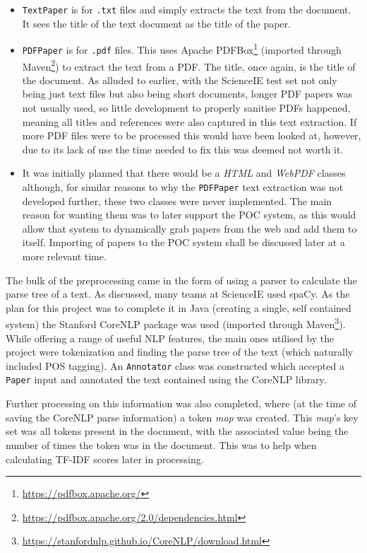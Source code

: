 \begin{itemize}
	\item \texttt{TextPaper} is for \texttt{.txt} files and simply extracts the text from the document. It sees the title of the text document as the title of the paper.
	\item \texttt{PDFPaper} is for \texttt{.pdf} files. This uses Apache PDFBox\footnote{\href{https://pdfbox.apache.org/}{https://pdfbox.apache.org/}} (imported through Maven\footnote{\href{https://pdfbox.apache.org/2.0/dependencies.html}{https://pdfbox.apache.org/2.0/dependencies.html}}) to extract the text from a PDF. The title, once again, is the title of the document. As alluded to earlier, with the ScienceIE test set not only being just text files but also being short documents, longer PDF papers was not usually used, so little development to properly sanitise PDFs happened, meaning all titles and references were also captured in this text extraction. If more PDF files were to be processed this would have been looked at, however, due to its lack of use the time needed to fix this was deemed not worth it.
	\item It was initially planned that there would be a \textit{HTML} and \textit{WebPDF} classes although, for similar reasons to why the \texttt{PDFPaper} text extraction was not developed further, these two classes were never implemented. The main reason for wanting them was to later support the POC system, as this would allow that system to dynamically grab papers from the web and add them to itself. Importing of papers to the POC system shall be discussed later at a more relevant time.
\end{itemize}

The bulk of the preprocessing came in the form of using a parser to calculate the parse tree of a text. As discussed, many teams at ScienceIE used spaCy. As the plan for this project was to complete it in Java (creating a single, self contained system) the Stanford CoreNLP package was used \cite{Manning2014} (imported through Maven\footnote{\href{https://stanfordnlp.github.io/CoreNLP/download.html}{https://stanfordnlp.github.io/CoreNLP/download.html}}). While offering a range of useful NLP features, the main ones utilised by the project were tokenization and finding the parse tree of the text (which naturally included POS tagging). An \texttt{Annotator} class was constructed which accepted a \texttt{Paper} input and annotated the text contained using the CoreNLP library.

Further processing on this information was also completed, where (at the time of saving the CoreNLP parse information) a token \textit{map} was created. This \textit{map}'s key set was all tokens present in the document, with the associated value being the number of times the token was in the document. This was to help when calculating TF-IDF scores later in processing.

